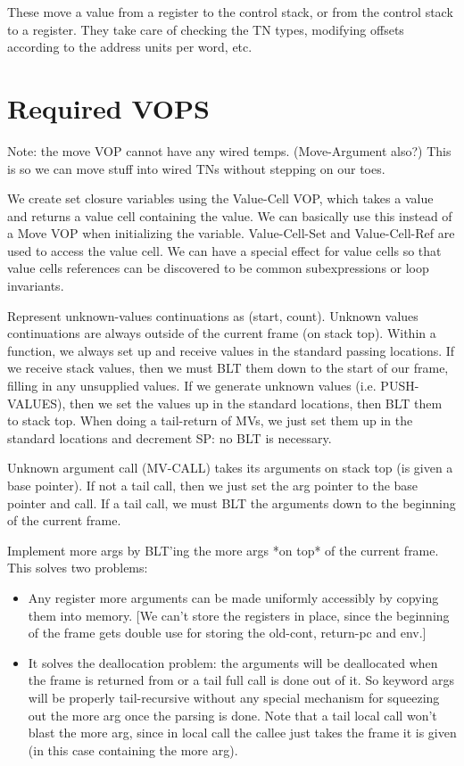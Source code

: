 \begin{Lentry}
\item[STORE-STACK-TN]
\item[LOAD-STACK-TN]
   These move a value from a register to the control stack, or from the
   control stack to a register.  They take care of checking the TN types,
   modifying offsets according to the address units per word, etc.
\end{Lentry}
\chapter{Required VOPS}


Note: the move VOP cannot have any wired temps.  (Move-Argument also?)  This is
so we can move stuff into wired TNs without stepping on our toes.


We create set closure variables using the Value-Cell VOP, which takes a value
and returns a value cell containing the value.  We can basically use this
instead of a Move VOP when initializing the variable.  Value-Cell-Set and
Value-Cell-Ref are used to access the value cell.  We can have a special effect
for value cells so that value cells references can be discovered to be common
subexpressions or loop invariants.




Represent unknown-values continuations as (start, count).  Unknown values
continuations are always outside of the current frame (on stack top).  Within a
function, we always set up and receive values in the standard passing
locations.  If we receive stack values, then we must BLT them down to the start
of our frame, filling in any unsupplied values.  If we generate unknown values
(i.e. PUSH-VALUES), then we set the values up in the standard locations, then
BLT them to stack top.  When doing a tail-return of MVs, we just set them up in
the standard locations and decrement SP: no BLT is necessary.

Unknown argument call (MV-CALL) takes its arguments on stack top (is given a
base pointer).  If not a tail call, then we just set the arg pointer to the
base pointer and call.  If a tail call, we must BLT the arguments down to the
beginning of the current frame.


Implement more args by BLT'ing the more args *on top* of the current frame.
This solves two problems:
\begin{itemize}
\item Any register more arguments can be made uniformly accessibly by copying
    them into memory.  [We can't store the registers in place, since the
    beginning of the frame gets double use for storing the old-cont, return-pc
    and env.]
\item It solves the deallocation problem: the arguments will be deallocated when
    the frame is returned from or a tail full call is done out of it.  So
    keyword args will be properly tail-recursive without any special mechanism
    for squeezing out the more arg once the parsing is done.  Note that a tail
    local call won't blast the more arg, since in local call the callee just
    takes the frame it is given (in this case containing the more arg).
\end{itemize}

